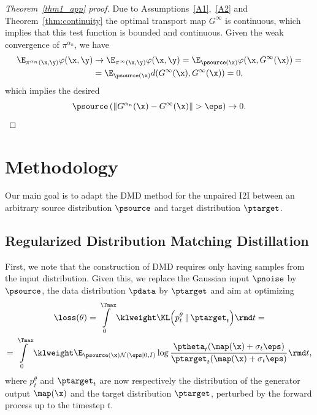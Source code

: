 \begin{proof}[Theorem~\ref{thm1_app} proof]
Due to Assumptions~\ref{A1},~\ref{A2} and Theorem~\ref{thm:continuity} the optimal transport map $G^\infty$ is continuous, which implies that this test function is bounded and continuous. Given the weak convergence of $\pi^{\alpha_n}$, we have
\begin{align}
    \E_{\pi^{\alpha_n}(\x, \y)} \varphi(\x, \y) &\rightarrow \E_{\pi^\infty(\x, \y)}\varphi(\x, \y) = \E_{\psource(\x)}\varphi(\x, G^\infty(\x)) =\\
    &= \E_{\psource(\x)} d(G^\infty(\x), G^\infty(\x)) = 0,
\end{align}
which implies the desired
\begin{equation}
    \psource\left(\|G^{\alpha_n}(\x) - G^{\infty}(\x)\| > \eps\right) \rightarrow 0.
\end{equation}
\end{proof}\section{Methodology}
\label{sec:method}
Our main goal is to adapt the DMD method for the unpaired I2I between an arbitrary source distribution $\psource$ and target distribution $\ptarget$.
\subsection{Regularized Distribution Matching Distillation}
\label{subsec:rdmd}
First, we note that the construction of DMD requires only having samples from the input distribution. Given this, we replace the Gaussian input $\pnoise$ by $\psource$, the data distribution $\pdata$ by $\ptarget$ and aim at optimizing
\begin{multline}
\label{eq:rdmd_kl_t_noreg}
    \loss(\theta) = \int\limits_0^{\Tmax} \klweight \KL \Big( p_t^\theta \,\|\, \ptarget_t \Big) \rmd t = \\
    =\int\limits_0^{\Tmax} \klweight \E_{\psource(\x) \mathcal{N}(\eps | 0, I)} \log \cfrac{\ptheta_t(\map(\x) + \sigma_t \eps)}{\ptarget_t(\map(\x) + \sigma_t \eps)} \,\rmd t,
\end{multline}
where $p^\theta_t$ and $\ptarget_t$ are now respectively the distribution of the generator output $\map(\x)$ and the target distribution $\ptarget$, perturbed by the forward process up to the timestep $t$.

